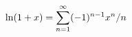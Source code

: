 \documentclass[preview]{standalone}
\begin{document}
\begin{align*}
\special{dvisvgm:raw <g id='unique000'>}\ln(1+x)=\sum_{n=1}^{\infty}(-1)^{n-1}x^n/n\special{dvisvgm:raw </g>}
\end{align*}
\end{document}
